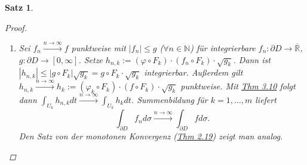 \documentclass[a4paper]{scrreprt}
\newcommand{\R}{\mathbb{R}}
\newcommand{\Rq}{\overline{\R}}
\newcommand{\N}{\mathbb{N}}
\newcommand{\jhyperref}[2]{\hyperref[j_#1]{#2}}
\newcommand{\jlink}[1]{\jhyperref{#1}{#1}}
\newcommand{\jabb}[3]{ #1: #2 \rightarrow #3 }
\theoremstyle{plain}
\newtheorem{satz}[thm]{Satz}
\theoremstyle{definition}
\begin{document}
{{{{\begin{satz}
\begin{proof}
\begin{enumerate}
            \item
                Sei $f_n \xrightarrow{n\rightarrow \infty} f$ punktweise mit $|f_n| \le g$ ($\forall n\in\N$) für integrierbare $\jabb{f_n}{\partial D}{\Rq}$, $\jabb{g}{\partial D}{[0,\infty]}$. Setze $h_{n,k}:= (\varphi \circ F_k)\cdot(f_n \circ F_k)\cdot\sqrt{g_k}$. Dann ist $|h_{n,k}| \le |g \circ F_k| \sqrt{g_k} = g\circ F_k \cdot \sqrt{g_k}$ integrierbar. Außerdem gilt $h_{n,k} \xrightarrow{n\rightarrow \infty} h_k := (\varphi_k \circ F_k)\cdot(f \circ F_k) \cdot \sqrt{g_k}$ punktweise. Mit \jlink{Thm 3.10} folgt dann $\int_{U_k} h_{n,k} dt \xrightarrow{n\rightarrow\infty} \int_{U_k} h_k dt$. Summenbildung für $k=1,\dots,m$ liefert
                \[
                    \int_{\partial D} f_n d\sigma \xrightarrow{n \rightarrow \infty} \int_{\partial D} f d\sigma.
                \]
                Den Satz von der monotonen Konvergenz (\jlink{Thm 2.19}) zeigt man analog.
        \end{enumerate}
    \end{proof}
\end{satz}

}}}}
\end{document}
